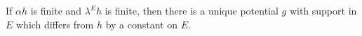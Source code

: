 If $\alpha h$ is finite and $\lambda^E h$ is finite, then there is a unique potential $g$ with support in $E$ which differs from $h$ by a constant on $E$.
